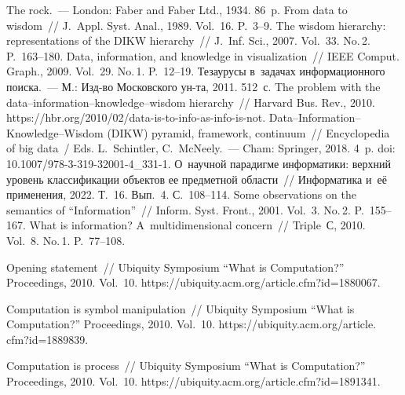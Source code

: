 \begin{multicols}{2}
{\small\frenchspacing
 {\baselineskip=10.5pt
 \begin{thebibliography}{99}
 The rock.~--- London: Faber and Faber Ltd., 1934. 86~p.
 From data to wisdom~// J.~Appl. Syst. Anal., 1989. Vol.~16. P.~3--9.
 The wisdom hierarchy: representations of the DIKW hierarchy~// J.~Inf. Sci., 2007. 
Vol.~33. No.\,2. P.~163--180.
 Data, information, and knowledge in visualization~// IEEE Comput. 
Graph., 2009. Vol.~29. No.\,1. P.~12--19.
 Тезаурусы в~задачах информационного поиска.~--- М.: Изд-во 
Московского ун-та, 2011. 512~с.
 The problem with the data--information--knowledge--wisdom hierarchy~// 
Harvard Bus. Rev., 2010. {\sf https://hbr.org/2010/02/data-is-to-info-as-info-is-not}.
 Data--Information--Knowledge--Wisdom (DIKW) pyramid, 
framework, continuum~// Encyclopedia of big data~/ Eds. L.~Schintler, C.~McNeely.~--- Cham: 
Springer, 2018. 4~p.  doi: 10.1007/978-3-319-32001-4\_\mbox{331-1}.
 О~научной парадигме информатики: верхний уровень классификации 
объектов ее предметной об\-ласти~// Информатика и~её применения, 2022. Т.~16. Вып.~4. 
С.~108--114.
 Some observations on the semantics of ``Information''~// Inform. Syst. 
Front., 2001. Vol.~3. No.\,2. P.~155--167.
 What is information? 
A~multidimensional concern~// Triple~С, 2010. Vol.~8. No.\,1. P.~77--108.

 Opening statement~// Ubiquity Symposium ``What is Computation?'' 
Proceedings, 2010. Vol.~10. {\sf https://ubiquity.acm.org/article.cfm?id=1880067}.

 Computation is symbol manipulation~// Ubiquity Symposium ``What is 
Computation?'' Proceedings, 2010. Vol.~10. {\sf https://ubiquity.acm.org/article. cfm?id=1889839}.


 Computation is process~//  Ubiquity Symposium ``What is Computation?'' 
Proceedings, 2010. Vol.~10. {\sf https://ubiquity.acm.org/article.cfm?id=1891341}.



\end{thebibliography}}}
\end{multicols}
